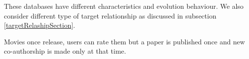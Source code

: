 


These databases have different characteristics and evolution behaviour. We also consider different type of target relationship as discussed in subsection \ref{targetRelashipSection}.

Movies once release, users can rate them but a paper is published once and new co-authorship is made only at that time.

